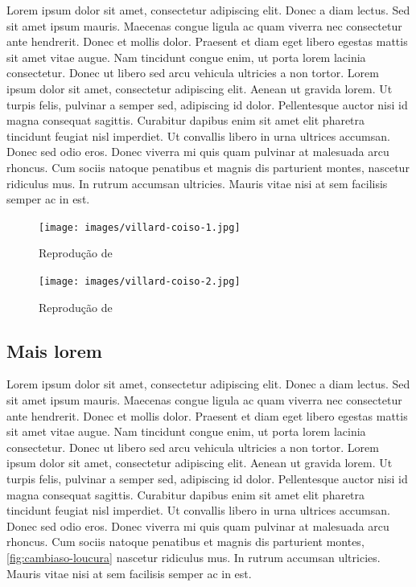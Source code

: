 \documentclass{article}
\begin{document}
Lorem ipsum dolor sit amet, consectetur adipiscing elit. Donec a diam lectus. Sed sit amet ipsum mauris. Maecenas congue ligula ac quam viverra nec consectetur ante hendrerit. Donec et mollis dolor. Praesent et diam eget libero egestas mattis sit amet vitae augue. Nam tincidunt congue enim, ut porta lorem lacinia consectetur. Donec ut libero sed arcu vehicula ultricies a non tortor. Lorem ipsum dolor sit amet, consectetur adipiscing elit. Aenean ut gravida lorem. Ut turpis felis, pulvinar a semper sed, adipiscing id dolor. Pellentesque auctor nisi id magna consequat sagittis. Curabitur dapibus enim sit amet elit pharetra tincidunt feugiat nisl imperdiet. Ut convallis libero in urna ultrices accumsan. Donec sed odio eros. Donec viverra mi quis quam pulvinar at malesuada arcu rhoncus. Cum sociis natoque penatibus et magnis dis parturient montes, nascetur ridiculus mus. In rutrum accumsan ultricies. Mauris vitae nisi at sem facilisis semper ac in est.

\begin{figure}
\centering\texttt{[image: images/villard-coiso-1.jpg]}
  \caption{Reprodução de \citeauthor{villard-coiso-1}}
  \label{fig:villard-coiso-1}
\end{figure}

\begin{figure}
\centering\texttt{[image: images/villard-coiso-2.jpg]}
  \caption{Reprodução de \citeauthor{villard-coiso-2}}
  \label{fig:villard-coiso-2}
\end{figure}

\subsection{Mais lorem}

Lorem ipsum dolor sit amet, consectetur adipiscing elit. Donec a diam lectus. Sed sit amet ipsum mauris. Maecenas congue ligula ac quam viverra nec consectetur ante hendrerit. Donec et mollis dolor. Praesent et diam eget libero egestas mattis sit amet vitae augue. Nam tincidunt congue enim, ut porta lorem lacinia consectetur. Donec ut libero sed arcu vehicula ultricies a non tortor. Lorem ipsum dolor sit amet, consectetur adipiscing elit. Aenean ut gravida lorem. Ut turpis felis, pulvinar a semper sed, adipiscing id dolor. Pellentesque auctor nisi id magna consequat sagittis. Curabitur dapibus enim sit amet elit pharetra tincidunt feugiat nisl imperdiet. Ut convallis libero in urna ultrices accumsan. Donec sed odio eros. Donec viverra mi quis quam pulvinar at malesuada arcu rhoncus. Cum sociis natoque penatibus et magnis dis parturient montes, \ref{fig:cambiaso-loucura} nascetur ridiculus mus. In rutrum accumsan ultricies. Mauris vitae nisi at sem facilisis semper ac in est.
\end{document}
